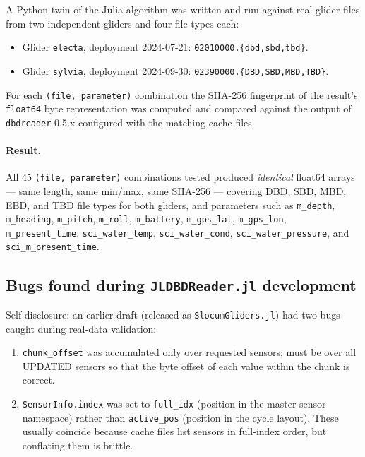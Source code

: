 \documentclass[11pt]{article}
\begin{document}
A Python twin of the Julia algorithm was written and run against real
glider files from two independent gliders and four file types each:

\begin{itemize}[leftmargin=*,topsep=1pt,itemsep=0pt]
  \item Glider \texttt{electa}, deployment 2024-07-21:
        \texttt{02010000.\{dbd,sbd,tbd\}}.
  \item Glider \texttt{sylvia}, deployment 2024-09-30:
        \texttt{02390000.\{DBD,SBD,MBD,TBD\}}.
\end{itemize}

For each \texttt{(file, parameter)} combination the SHA-256 fingerprint of
the result's \texttt{float64} byte representation was computed and compared
against the output of \texttt{dbdreader} 0.5.x configured with the matching
cache files.

\paragraph{Result.}
All 45 \texttt{(file, parameter)} combinations tested produced
\emph{identical} float64 arrays — same length, same min/max, same SHA-256
— covering DBD, SBD, MBD, EBD, and TBD file types for both gliders, and
parameters such as \texttt{m\_depth}, \texttt{m\_heading},
\texttt{m\_pitch}, \texttt{m\_roll}, \texttt{m\_battery},
\texttt{m\_gps\_lat}, \texttt{m\_gps\_lon}, \texttt{m\_present\_time},
\texttt{sci\_water\_temp}, \texttt{sci\_water\_cond},
\texttt{sci\_water\_pressure}, and \texttt{sci\_m\_present\_time}.

\subsection{Bugs found during \texttt{JLDBDReader.jl} development}

Self-disclosure: an earlier draft (released as \texttt{SlocumGliders.jl})
had two bugs caught during real-data validation:

\begin{enumerate}[leftmargin=*,topsep=1pt,itemsep=0pt]
  \item \texttt{chunk\_offset} was accumulated only over requested sensors;
    must be over all UPDATED sensors so that the byte offset of each value
    within the chunk is correct.
  \item \texttt{SensorInfo.index} was set to \texttt{full\_idx} (position in
    the master sensor namespace) rather than \texttt{active\_pos} (position
    in the cycle layout).  These usually coincide because cache files list
    sensors in full-index order, but conflating them is brittle.
\end{enumerate}
\end{document}
